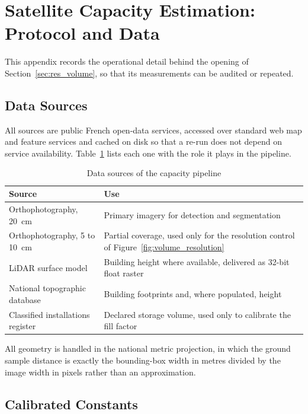 \section{Satellite Capacity Estimation: Protocol and Data}
\label{app:volume}

This appendix records the operational detail behind the opening of
Section~\ref{sec:res_volume}, so that its measurements can be audited or repeated.

\subsection*{Data Sources}

All sources are public French open-data services, accessed over standard web map and feature
services and cached on disk so that a re-run does not depend on service availability.
Table~\ref{tab:app_volume_sources} lists each one with the role it plays in the pipeline.

\begin{table}[htbp]
\centering
\caption{Data sources of the capacity pipeline}
\label{tab:app_volume_sources}
\small
\begin{tabularx}{\linewidth}{>{\raggedright\arraybackslash}p{4.0cm} X}
\toprule
\textbf{Source} & \textbf{Use} \\
\midrule
Orthophotography, 20~cm & Primary imagery for detection and segmentation \\
Orthophotography, 5 to 10~cm & Partial coverage, used only for the resolution control of
Figure~\ref{fig:volume_resolution} \\
LiDAR surface model & Building height where available, delivered as 32-bit float raster \\
National topographic database & Building footprints and, where populated, height \\
Classified installations register & Declared storage volume, used only to calibrate the
fill factor \\
\bottomrule
\end{tabularx}
\end{table}

All geometry is handled in the national metric projection, in which the ground sample
distance is exactly the bounding-box width in metres divided by the image width in pixels
rather than an approximation.

\subsection*{Calibrated Constants}

